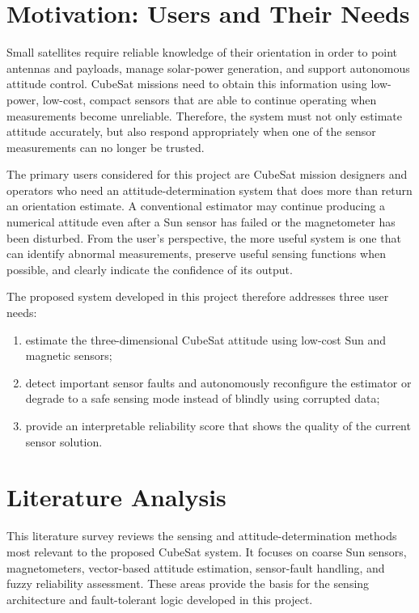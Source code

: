 \documentclass[11pt,a4paper]{article}
\begin{document}
\section{Motivation: Users and Their Needs}

Small satellites require reliable knowledge of their orientation in order to point antennas and payloads, manage solar-power generation, and support autonomous attitude control. CubeSat missions need to obtain this information using low-power, low-cost, compact sensors that are able to continue operating when measurements become unreliable. Therefore, the system must not only estimate attitude accurately, but also respond appropriately when one of the sensor measurements can no longer be trusted.

The primary users considered for this project are CubeSat mission designers and operators who need an attitude-determination system that does more than return an orientation estimate. A conventional estimator may continue producing a numerical attitude even after a Sun sensor has failed or the magnetometer has been disturbed. From the user's perspective, the more useful system is one that can identify abnormal measurements, preserve useful sensing functions when possible, and clearly indicate the confidence of its output.

The proposed system developed in this project therefore addresses three user needs:
\begin{enumerate}
    \item estimate the three-dimensional CubeSat attitude using low-cost Sun and magnetic sensors;
    \item detect important sensor faults and autonomously reconfigure the estimator or degrade to a safe sensing mode instead of blindly using corrupted data;
    \item provide an interpretable reliability score that shows the quality of the current sensor solution.
\end{enumerate}

\clearpage

\section{Literature Analysis}

This literature survey reviews the sensing and attitude-determination methods most relevant to the proposed CubeSat system. It focuses on coarse Sun sensors, magnetometers, vector-based attitude estimation, sensor-fault handling, and fuzzy reliability assessment. These areas provide the basis for the sensing architecture and fault-tolerant logic developed in this project.
\end{document}
